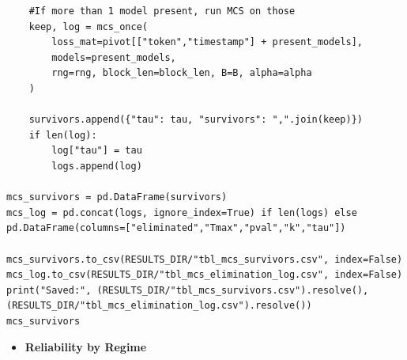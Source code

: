 \documentclass[
  a4paper,
  DIV=11,
  numbers=noendperiod]{scrreprt}
\providecommand{\tightlist}{%
  \setlength{\itemsep}{0pt}\setlength{\parskip}{0pt}}
\begin{document}
\begin{verbatim}
    #If more than 1 model present, run MCS on those
    keep, log = mcs_once(
        loss_mat=pivot[["token","timestamp"] + present_models],
        models=present_models,
        rng=rng, block_len=block_len, B=B, alpha=alpha
    )

    survivors.append({"tau": tau, "survivors": ",".join(keep)})
    if len(log):
        log["tau"] = tau
        logs.append(log)

mcs_survivors = pd.DataFrame(survivors)
mcs_log = pd.concat(logs, ignore_index=True) if len(logs) else pd.DataFrame(columns=["eliminated","Tmax","pval","k","tau"])

mcs_survivors.to_csv(RESULTS_DIR/"tbl_mcs_survivors.csv", index=False)
mcs_log.to_csv(RESULTS_DIR/"tbl_mcs_elimination_log.csv", index=False)
print("Saved:", (RESULTS_DIR/"tbl_mcs_survivors.csv").resolve(), (RESULTS_DIR/"tbl_mcs_elimination_log.csv").resolve())
mcs_survivors
\end{verbatim}

\begin{itemize}
\tightlist
\item
  \textbf{Reliability by Regime}
\end{itemize}
\end{document}
